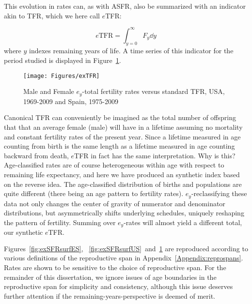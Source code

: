  \FloatBarrier
 \label{sec:etfr}
This evolution in rates can, as with ASFR, also be
summarized with an indicator akin to TFR, which we here call $e$TFR:

\begin{equation}
\label{eq:exTFR}
e\mathrm{TFR} = \int _{y=0}^\infty F_y \dd y
\end{equation}
where $y$ indexes remaining years of life. A time series of this indicator
for the period studied is displayed in Figure~\ref{fig:exTFR}.

\begin{figure}[ht!]
        \centering  
          \caption{Male and Female $e_y$-total fertility rates versus standard
          TFR, USA, 1969-2009 and Spain, 1975-2009}
           \texttt{[image: Figures/exTFR]}
          \label{fig:exTFR}
\end{figure}

Canonical TFR can conveniently be imagined as the total number of
offspring that that an average female (male) will have in a lifetime assuming
no mortality and constant fertility rates of the present year.
Since a lifetime measured in age counting from birth is the same length as a
lifetime measured in age counting backward from death, $e$TFR in fact has the
same interpretation. Why is this? Age-classified rates are of course
heterogeneous within age with respect to remaining life expectancy, and here we
have produced an synthetic index based on the reverse idea. The age-classified
distribution of births and populations are quite different (there being an age
pattern to fertility rates). $e_y$-reclassifying these data not only changes the
center of gravity of numerator and denominator distributions, but asymmetrically
shifts underlying schedules, uniquely reshaping the pattern of
fertility. Summing over $e_y$-rates will almost yield a different total, our
synthetic $e$TFR. 

Figures~\ref{fig:exSFRsurfES}, ~\ref{fig:exSFRsurfUS}~and~\ref{fig:exTFR} are
reproduced according to various definitions of the reproductive span in
Appendix~\ref{Appendix:reprospans}. Rates are shown to be sensitive to the
choice of reproductive span. For the remainder of this dissertation, we ignore
issues of age boundaries in the reproductive span for simplicity and
consistency, although this issue deserves further attention if the
remaining-years-perspective is deemed of merit.
